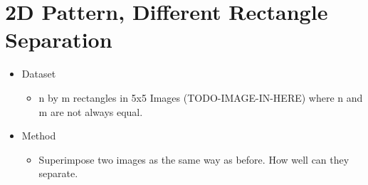     \section{2D Pattern, Different Rectangle Separation}
    \begin{itemize}
      \item Dataset
      \begin{itemize}
        \item n by m rectangles in 5x5 Images (TODO-IMAGE-IN-HERE) where n and m are not always equal.
      \end{itemize}
      \item Method
      \begin{itemize}
        \item Superimpose two images as the same way as before. How well can they separate.
      \end{itemize}
    \end{itemize}

